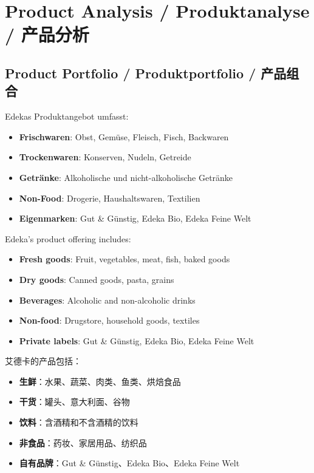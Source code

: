 \chapter{Product Analysis / Produktanalyse / 产品分析}

\section{Product Portfolio / Produktportfolio / 产品组合}

\begin{otherlanguage}{ngerman}
Edekas Produktangebot umfasst:
\begin{itemize}
    \item \textbf{Frischwaren}: Obst, Gemüse, Fleisch, Fisch, Backwaren
    \item \textbf{Trockenwaren}: Konserven, Nudeln, Getreide
    \item \textbf{Getränke}: Alkoholische und nicht-alkoholische Getränke
    \item \textbf{Non-Food}: Drogerie, Haushaltswaren, Textilien
    \item \textbf{Eigenmarken}: Gut \& Günstig, Edeka Bio, Edeka Feine Welt
\end{itemize}
\end{otherlanguage}

Edeka's product offering includes:
\begin{itemize}
    \item \textbf{Fresh goods}: Fruit, vegetables, meat, fish, baked goods
    \item \textbf{Dry goods}: Canned goods, pasta, grains
    \item \textbf{Beverages}: Alcoholic and non-alcoholic drinks
    \item \textbf{Non-food}: Drugstore, household goods, textiles
    \item \textbf{Private labels}: Gut \& Günstig, Edeka Bio, Edeka Feine Welt
\end{itemize}

艾德卡的产品包括：
\begin{itemize}
    \item \textbf{生鲜}：水果、蔬菜、肉类、鱼类、烘焙食品
    \item \textbf{干货}：罐头、意大利面、谷物
    \item \textbf{饮料}：含酒精和不含酒精的饮料
    \item \textbf{非食品}：药妆、家居用品、纺织品
    \item \textbf{自有品牌}：Gut \& Günstig、Edeka Bio、Edeka Feine Welt
\end{itemize}

